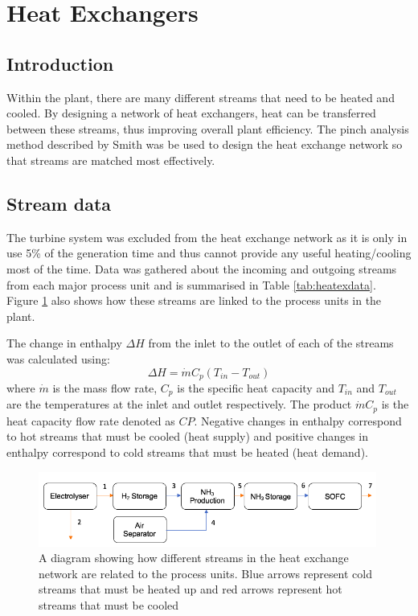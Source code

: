 \documentclass[11pt, oneside]{article}
\begin{document}
\section{Heat Exchangers}
\subsection{Introduction}

Within the plant, there are many different streams that need to be heated and cooled. By designing a network of heat exchangers, heat can be transferred between these streams, thus improving overall plant efficiency. The pinch analysis method described by Smith \cite{hexbook} \cite{lecture:hex} was be used to design the heat exchange network so that streams are matched most effectively. 

\subsection{Stream data}
The turbine system was excluded from the heat exchange network as it is only in use 5\% of the generation time and thus cannot provide any useful heating/cooling most of the time. Data was gathered about the incoming and outgoing streams from each major process unit and is summarised in Table \ref{tab:heatexdata}. Figure \ref{fig:heatexflow} also shows how these streams are linked to the process units in the plant.

The change in enthalpy $\Delta H$ from the inlet to the outlet of each of the streams was calculated using:
\begin{equation} \label{eq:heatex}
\Delta H = \dot{m} C_p (T_{in} - T_{out})
\end{equation}
where $\dot{m}$ is the mass flow rate, $C_p$ is the specific heat capacity and $T_{in}$ and $T_{out}$ are the temperatures at the inlet and outlet respectively. The product $\dot{m} C_p$ is the heat capacity flow rate denoted as $CP$. Negative changes in enthalpy correspond to hot streams that must be cooled (heat supply) and positive changes in enthalpy correspond to cold streams that must be heated (heat demand).

\begin{figure} [h]
\centering
\includegraphics[width=0.99\textwidth]{./pictures/heatexflow.png}
  \caption{A diagram showing how different streams in the heat exchange network are related to the process units. Blue arrows represent cold streams that must be heated up and red arrows represent hot streams that must be cooled} \label{fig:heatexflow}
\end{figure}
\end{document}
